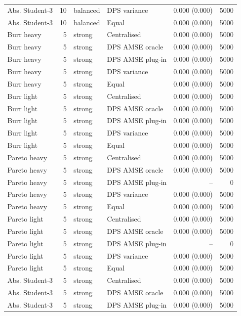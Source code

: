 \begin{tabular}{lrllrr}
Abs. Student-3 & 10 & balanced & DPS variance & 0.000 (0.000) & 5000 \\
Abs. Student-3 & 10 & balanced & Equal & 0.000 (0.000) & 5000 \\
Burr heavy & 5 & strong & Centralised & 0.000 (0.000) & 5000 \\
Burr heavy & 5 & strong & DPS AMSE oracle & 0.000 (0.000) & 5000 \\
Burr heavy & 5 & strong & DPS AMSE plug-in & 0.000 (0.000) & 5000 \\
Burr heavy & 5 & strong & DPS variance & 0.000 (0.000) & 5000 \\
Burr heavy & 5 & strong & Equal & 0.000 (0.000) & 5000 \\
Burr light & 5 & strong & Centralised & 0.000 (0.000) & 5000 \\
Burr light & 5 & strong & DPS AMSE oracle & 0.000 (0.000) & 5000 \\
Burr light & 5 & strong & DPS AMSE plug-in & 0.000 (0.000) & 5000 \\
Burr light & 5 & strong & DPS variance & 0.000 (0.000) & 5000 \\
Burr light & 5 & strong & Equal & 0.000 (0.000) & 5000 \\
Pareto heavy & 5 & strong & Centralised & 0.000 (0.000) & 5000 \\
Pareto heavy & 5 & strong & DPS AMSE oracle & 0.000 (0.000) & 5000 \\
Pareto heavy & 5 & strong & DPS AMSE plug-in & -- & 0 \\
Pareto heavy & 5 & strong & DPS variance & 0.000 (0.000) & 5000 \\
Pareto heavy & 5 & strong & Equal & 0.000 (0.000) & 5000 \\
Pareto light & 5 & strong & Centralised & 0.000 (0.000) & 5000 \\
Pareto light & 5 & strong & DPS AMSE oracle & 0.000 (0.000) & 5000 \\
Pareto light & 5 & strong & DPS AMSE plug-in & -- & 0 \\
Pareto light & 5 & strong & DPS variance & 0.000 (0.000) & 5000 \\
Pareto light & 5 & strong & Equal & 0.000 (0.000) & 5000 \\
Abs. Student-3 & 5 & strong & Centralised & 0.000 (0.000) & 5000 \\
Abs. Student-3 & 5 & strong & DPS AMSE oracle & 0.000 (0.000) & 5000 \\
Abs. Student-3 & 5 & strong & DPS AMSE plug-in & 0.000 (0.000) & 5000 \\

\end{tabular}
